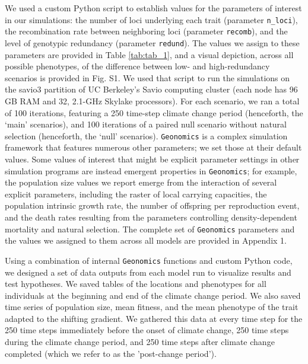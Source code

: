 \documentclass[9pt,twocolumn,twoside,lineno]{new_article}
\begin{document}
We used a custom Python script to establish values for the parameters of interest in our simulations: the number of loci underlying
each trait (parameter \texttt{n\_loci}),
the recombination rate between neighboring loci
(parameter \texttt{recomb}),
and the level of genotypic redundancy (parameter \texttt{redund}).
The values we assign to these parameters are provided in Table \ref{tab:tab_1}, and a visual depiction, across all possible phenotypes, of the difference between low- and high-redundancy scenarios is provided in Fig. S1.
We used that script to run the simulations on the 
savio3 partition of UC Berkeley’s Savio computing cluster (each node has 96 GB RAM and 32, 
2.1-GHz Skylake processors). For each scenario, we ran a total of 100 iterations, featuring a 250 time-step climate change period (henceforth, 
the ‘main’ scenarios), and 100 iterations of a paired null scenario without natural 
selection (henceforth, the ‘null’ scenarios). 
\texttt{Geonomics} is a complex simulation framework that features numerous other 
parameters; we set those at their default values.
Some values of interest that might be explicit parameter settings in
other simulation programs are instead
emergent properties in \texttt{Geonomics}; for example, the population size values we report emerge from the interaction
of several explicit parameters, including the raster of local carrying capacities,
the population intrinsic growth rate, the number of offspring per reproduction event,
and the death rates resulting from the parameters controlling density-dependent mortality
and natural selection.
The complete set of \texttt{Geonomics} parameters and the values 
we assigned to them across all models are provided in Appendix 1.

Using a combination of internal \texttt{Geonomics} functions and custom Python code, we 
designed a set of data outputs from each model run
to visualize results and test hypotheses.
We saved tables of the locations and phenotypes for all individuals at
the beginning and end of the climate change period. We also saved time 
series of population size, mean fitness, and the mean phenotype of the trait adapted to 
the shifting gradient. We gathered this data at every time step for the 250 time steps immediately 
before the onset of climate change, 250 time steps during the climate change period, and 250 time steps after climate change completed (which we refer to as the 'post-change period').
\end{document}
